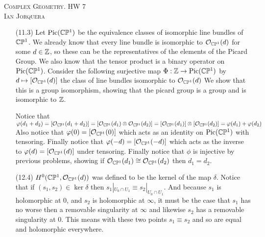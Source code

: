 \documentclass[12pt]{amsart}
\begin{document}
\begin{center}
    \textsc{Complex Geometry. HW 7\\ Ian Jorquera}
\end{center}
\vspace{1em}
\begin{itemize}
    \item[(11.3)] Let $\text{Pic}(\mathbb{C}\mathbb{P}^1)$ be the equivalence classes of isomorphic 
    line bundles of $\mathbb{C}\mathbb{P}^1$. We already know that every line bundle is isomorphic to $\mathcal O_{\mathbb{C}\mathbb{P}^1}(d)$
    for some $d\in \mathbb{Z}$, so these can be the representatives of the elements of the Picard Group. 
    We also know that the tensor product is a binary operator on $\text{Pic}(\mathbb{C}\mathbb{P}^1)$.
    Consider the following surjective map $\Phi:\mathbb{Z}\rightarrow \text{Pic}(\mathbb{C}\mathbb{P}^1)$ by 
    $d\mapsto [\mathcal{O}_{\mathbb{C}\mathbb{P}^1}(d)]$ the class of line bundles isomorphic to $\mathcal{O}_{\mathbb{C}\mathbb{P}^1}(d)$
    We show that this is a group isomorphism, showing that the picard group is a group and is isomorphic to $\mathbb{Z}$.

    Notice that $\varphi(d_1+d_2)= [\mathcal O_{\mathbb{C}\mathbb{P}^1}(d_1+d_2)]=[\mathcal O_{\mathbb{C}\mathbb{P}^1}(d_1)\otimes \mathcal O_{\mathbb{C}\mathbb{P}^1}(d_2)]=[\mathcal O_{\mathbb{C}\mathbb{P}^1}(d_1)]\otimes [\mathcal O_{\mathbb{C}\mathbb{P}^1}(d_2)]= \varphi(d_1)+\varphi(d_2)$
    Also notice that $\varphi(0)=[\mathcal O_{\mathbb{C}\mathbb{P}^1}(0)]$ which acts as an identity on $\text{Pic}(\mathbb{C}\mathbb{P}^1)$ with tensoring.
    Finally notice that $\varphi(-d)=[\mathcal O_{\mathbb{C}\mathbb{P}^1}(-d)]$ which acts as the inverse to $\varphi(d)=[\mathcal O_{\mathbb{C}\mathbb{P}^1}(d)]$ under tensoring.
    Finally notice that $\phi$ is injective by previous problems, showing if $\mathcal O_{\mathbb{C}\mathbb{P}^1}(d_1)\cong \mathcal O_{\mathbb{C}\mathbb{P}^1}(d_2)$
    then $d_1=d_2$. \\

    \item[(12.4)]  $H^0(\mathbb{C}\mathbb{P}^1, \mathcal O_{\mathbb{C}\mathbb{P}^1}(d))$ was defined to be the kernel of the map $\delta$. Notice that 
    if $(s_1,s_2)\in \ker\delta$ then $s_1|_{U_0\cap U_1}\equiv s_2|_{U_0\cap U_1}$. And because $s_1$ is holomorphic 
    at $0$, and $s_2$ is holomorphic at $\infty$, it must be the case that $s_1$ has no 
    worse then a removable singularity at $\infty$ and likewise $s_2$ has a removable singularity at $0$. This means with 
    these two points $s_1\equiv s_2$ and so are equal and holomorphic everywhere.
\end{itemize}
\end{document}
